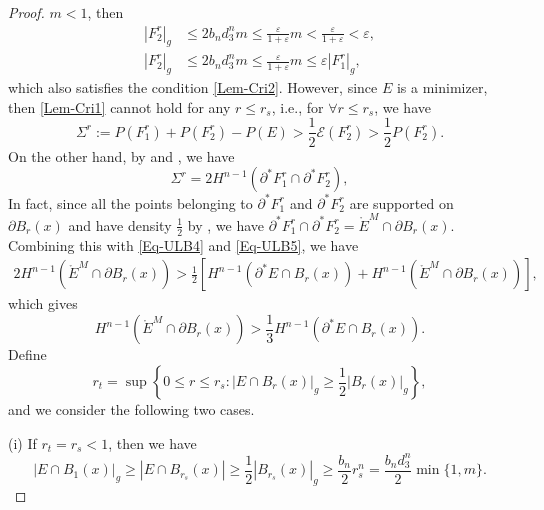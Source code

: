 \documentclass[11pt,reqno]{amsart}
\theoremstyle{definition}
\theoremstyle{remark}
\numberwithin{equation}{section}
\renewcommand{\(}{\left(}
\renewcommand{\)}{\right)}
\renewcommand{\-}{\overline}
\begin{document}
\begin{proof}
   $m<1$, then 
	\begin{align*}
	|F_2^r|_g&\leq 2b_n d_3^n m\leq\frac{\varepsilon}{1+\varepsilon}m<\frac{\varepsilon}{1+\varepsilon}<\varepsilon,\\
	|F_2^r|_g&\leq 2b_n d_3^n m\leq\frac{\varepsilon}{1+\varepsilon}m\leq\varepsilon |F_1^r|_g,
	\end{align*}
which also satisfies the condition \eqref{Lem-Cri2}. However, since $E$ is a minimizer, then \eqref{Lem-Cri1} cannot hold for any $r\leq r_s$, i.e., for $\forall r\leq r_s$, we have
\begin{equation}\label{Eq-ULB4}
	\Sigma^r:=P(F_1^r)+P(F_2^r)-P(E)>\frac{1}{2}\mathcal{E}(F_2^r)>\frac{1}{2}P(F_2^r).
\end{equation}
On the other hand, by \cite[Proposition 1]{Ambrosio01} and \cite[Theorem 3.61]{Ambrosio-Fusco-Pallara00}, we have
\begin{equation}\label{Eq-ULB5}
		\Sigma^r=2H^{n-1}(\partial^{*}F_1^r\cap\partial^{*}F_2^r),
\end{equation}
In fact, since all the points belonging to $\partial^{*}F_1^r$ and $\partial^{*}F_2^r$ are supported on $\partial B_r(x)$ and have density $\frac{1}{2}$ by \cite[Theorem 3.61]{Ambrosio-Fusco-Pallara00}, we have $\partial^{*}F_1^r\cap\partial^{*}F_2^r=\mathring{E}^M\cap\partial B_r(x)$. Combining this with \eqref{Eq-ULB4} and \eqref{Eq-ULB5}, we have
\begin{align*}
	2H^{n-1}(\mathring{E}^M\cap\partial B_r(x))>\frac{1}{2}\left[H^{n-1}(\partial^{*}E\cap B_r(x))+H^{n-1}(\mathring{E}^M\cap\partial B_r(x))\right], 
\end{align*}
which gives
\begin{equation}\label{Eq-ULB6}
	H^{n-1}(\mathring{E}^M\cap\partial B_r(x))>\frac{1}{3}H^{n-1}(\partial^{*}E\cap B_r(x)).
\end{equation}
Define
\begin{equation}\label{Eq-ULB7}
	r_t=\sup\left\{0\leq r\leq r_s:|E\cap B_r(x)|_g\geq\frac{1}{2}|B_r(x)|_g\right\},
\end{equation}
and we consider the following two cases.

(i) If $r_t=r_s<1$, then we have 
\begin{equation}\label{Eq-ULB8}
	|E\cap B_1(x)|_g\geq |E\cap B_{r_s}(x)|\geq \frac{1}{2}|B_{r_s}(x)|_g\geq\frac{b_n}{2}r_s^n=\frac{b_n d_3^n}{2}\min\{1,m\}.
\end{equation}


\end{proof}
\end{document}
